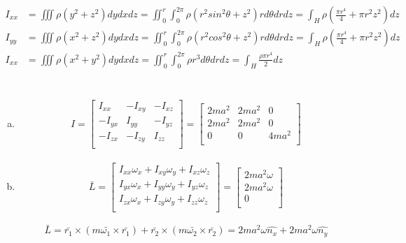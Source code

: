 \documentclass{article}
\begin{document}
\begin{align*}
I_{xx}&=\iiint\rho(y^2+z^2)dydxdz=\iint_0^r\int_0^{2\pi}\rho(r^2sin^2\theta+z^2)rd\theta drdz=\int_H\rho\left(\frac{\pi r^4}{4}+\pi r^2z^2\right)dz\\
I_{yy}&=\iiint\rho(x^2+z^2)dydxdz=\iint_0^r\int_0^{2\pi}\rho(r^2cos^2\theta+z^2)rd\theta drdz=\int_H\rho\left(\frac{\pi r^4}{4}+\pi r^2z^2\right)dz\\
I_{xx}&=\iiint\rho(x^2+y^2)dydxdz=\iint_0^r\int_0^{2\pi}\rho r^3d\theta drdz=\int_H\frac{\rho\pi r^4}{2}dz
\end{align*}

\section{}
\begin{enumerate}[(a)]
\item
\begin{gather*}
I=
\begin{bmatrix}
	 I_{xx} & -I_{xy} & -I_{xz}\\
	-I_{yx} &  I_{yy} & -I_{yz}\\
	-I_{zx} & -I_{zy} &  I_{zz}\\
\end{bmatrix}
=
\begin{bmatrix}
	 2ma^2  &  2ma^2  &     0	\\
	 2ma^2	&  2ma^2  &     0   \\
	    0   & 	  0	  &  4ma^2	\\
\end{bmatrix}
\end{gather*}

\item
\begin{gather*}
\bar{L}=
\begin{bmatrix}
	I_{xx}\omega_x + I_{xy}\omega_y + I_{xz}\omega_z\\
	I_{yx}\omega_x + I_{yy}\omega_y + I_{yz}\omega_z\\
	I_{zx}\omega_x + I_{zy}\omega_y + I_{zz}\omega_z\\
\end{bmatrix}
=
\begin{bmatrix}
	 2ma^2\omega\\
	 2ma^2\omega\\
	 0\\
\end{bmatrix}
\end{gather*}

$$\bar{L}=\bar{r_1}\times(m\bar{\omega_1}\times\bar{r_1})+\bar{r_2}\times(m\bar{\omega_2}\times\bar{r_2})=2ma^2\omega\hat{n_x}+2ma^2\omega\hat{n_y}$$


\end{enumerate}
\end{document}
